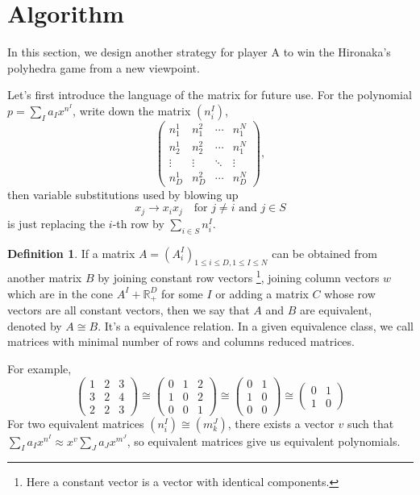 \documentclass[12pt]{article}
\theoremstyle{definition}
\newtheorem{defi}[para]{Definition}
\theoremstyle{plain}
\begin{document}
\section{Algorithm}

In this section, we design another strategy for player A to win the Hironaka's
polyhedra game from a new viewpoint. 

Let's first introduce the language of the matrix for future use.
For the polynomial $p=\sum_I a_I x^{n^I}$, write down the matrix $(n^I_i)$, 
\[
\begin{pmatrix}
	n_1^1 & n_1^2 & \cdots & n_1^N\\
	n_2^1 & n_2^2 & \cdots & n_1^N\\
	\vdots & \vdots & \ddots & \vdots\\
	n_D^1 & n_D^2 & \cdots & n_D^N
\end{pmatrix},
\]
then variable substitutions used by blowing up
\[
	x_j\to x_ix_j \quad \text{for $j\neq i$ and $j\in S$}
\] 
is just replacing the $i$-th row by $\sum_{i\in S} n_i^I$.

\begin{defi}
If a matrix $A=(A^I_i)_{1\leq i\leq D,1\leq I\leq N}$ 
can be obtained from another matrix $B$ by joining constant row vectors%
\footnote{Here a constant vector is a vector with identical components.},
joining column vectors $w$ which are in the cone $A^I+\mathbb R_+^D$ for 
some $I$ or adding a matrix $C$ whose row vectors are all constant vectors,
then we say that $A$ and $B$ are equivalent, denoted by $A\cong B$.
It's a equivalence relation.
In a given equivalence class, we call matrices with minimal number of rows and columns 
reduced matrices.
\end{defi}

For example, 
\[
\begin{pmatrix}
	1&2&3\\
	3&2&4\\
	2&2&3
\end{pmatrix}\cong
\begin{pmatrix}
	0&1&2\\
	1&0&2\\
	0&0&1
\end{pmatrix}\cong
\begin{pmatrix}
	0&1\\
	1&0\\
	0&0
\end{pmatrix}\cong
\begin{pmatrix}
	0&1\\
	1&0
\end{pmatrix} 
\]
For two equivalent matrices $(n^I_i)\cong (m^J_k)$, there exists a vector $v$ such that 
$\sum_I a_I x^{n^I}\approx x^v\sum_J a_J x^{m^J}$, so equivalent matrices give us
equivalent polynomials.
\end{document}
